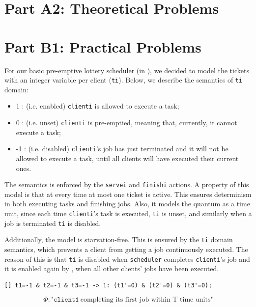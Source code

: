 \documentclass{report}
\begin{document}
\chapter{Part A2: Theoretical Problems}

\chapter{Part B1: Practical Problems}

For our basic pre-emptive lottery scheduler (in ), we decided to model the tickets with an integer variable per client (\texttt{ti}). Below, we describe the semantics of \texttt{ti} domain:

\begin{itemize}
\item 1 : (i.e. enabled) \texttt{clienti} is allowed to execute a task;
\item 0 : (i.e. unset) \texttt{clienti} is pre-emptied, meaning that, currently, it cannot execute a task;
\item -1 : (i.e. disabled) \texttt{clienti}'s job has just terminated and it will not be allowed to execute a task, until all clients will have executed their current ones.
\end{itemize}

The semantics is enforced by the \texttt{servei} and \texttt{finishi} actions. A property of this model is that at every time at most one ticket is active. This ensures determinism in both executing tasks and finishing jobs. Also, it models the quantum as a time unit, since each time \texttt{clienti}'s task is executed, \texttt{ti} is unset, and similarly when a job is terminated \texttt{ti} is disabled.

Additionally, the model is starvation-free. This is ensured by the \texttt{ti} domain semantics, which prevents a client from getting a job continuously executed. The reason of this is that \texttt{ti} is disabled when \texttt{scheduler} completes \texttt{clienti}'s job and it is enabled again by , when all other clients' jobs have been executed.

\begin{lstlisting}[caption=Action in enabling ti back - from \Cref{mod:LS-b11a},label=lst:ti-reactivate]
[] t1=-1 & t2=-1 & t3=-1 -> 1: (t1'=0) & (t2'=0) & (t3'=0);
\end{lstlisting}

\begin{equation}
  \label{eq:phi-b11}
  \Phi: \text{"}\mathtt{client1} \ \text{completing its first job within T time units"}
\end{equation}
\end{document}
